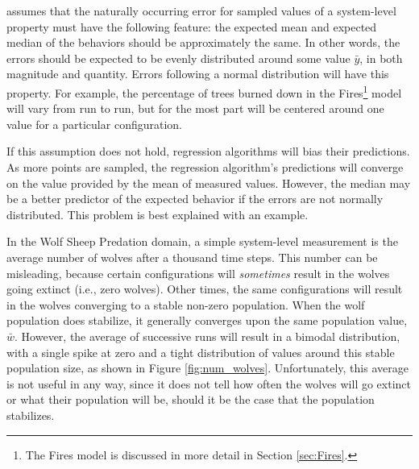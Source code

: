 \fw assumes that the naturally occurring error for sampled values of a system-level property must have the following feature: the expected mean and expected median of the behaviors should be approximately the same.
In other words, the errors should be expected to be evenly distributed around some value $\bar y$, in  both magnitude and quantity.
Errors following a normal distribution will have this property.
For example, the percentage of trees burned down in the Fires\footnote{The Fires model is discussed in more detail in Section \ref{sec:Fires}.} model will vary from run to run, but for the most part will be centered around one value for a particular configuration.

If this assumption does not hold, regression algorithms will bias their predictions.
As more points are sampled, the regression algorithm's predictions will converge on the value provided by the mean of measured values.
However, the median may be a better predictor of the expected behavior if the errors are not normally distributed.
This problem is best explained with an example.


In the Wolf Sheep Predation domain, a simple system-level measurement is the average number of wolves after a thousand time steps.
This number can be misleading, because certain configurations will \textit{sometimes} result in the wolves going extinct (i.e., zero wolves).
Other times, the same configurations will result in the wolves converging to a stable non-zero population.
When the wolf population does stabilize, it generally converges upon the same population value, $\bar w$.
However, the average of successive runs will result in a bimodal distribution, with a single spike at zero and a tight distribution of values around this stable population size, as shown in Figure \ref{fig:num_wolves}.
Unfortunately, this average is not useful in any way, since it does not tell how often the wolves will go extinct or what their population will be, should it be the case that the population stabilizes.


